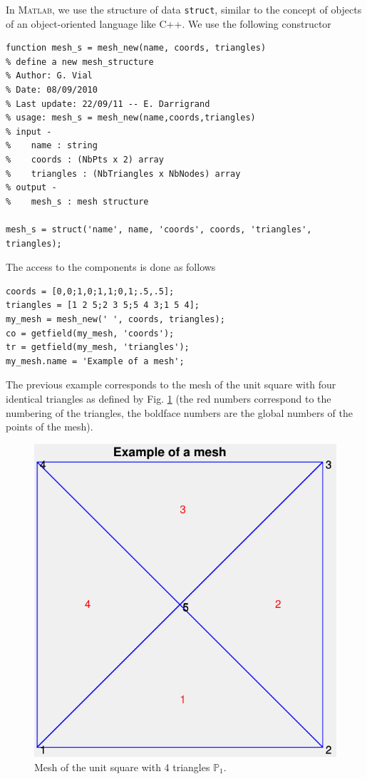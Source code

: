 \documentclass[11pt,a4paper,center,notitlepage]{article}
\numberwithin{equation}{section}
\begin{document}
In \textsc{Matlab}, we use the structure of data \texttt{struct}, similar to the concept of objects of an object-oriented language like C++. We use the following constructor
\begin{verbatim}
function mesh_s = mesh_new(name, coords, triangles)
% define a new mesh_structure
% Author: G. Vial
% Date: 08/09/2010
% Last update: 22/09/11 -- E. Darrigrand
% usage: mesh_s = mesh_new(name,coords,triangles)
% input -
%    name : string
%    coords : (NbPts x 2) array
%    triangles : (NbTriangles x NbNodes) array
% output -
%    mesh_s : mesh structure

mesh_s = struct('name', name, 'coords', coords, 'triangles', triangles);
\end{verbatim}
The access to the components is done as follows
\begin{verbatim}
coords = [0,0;1,0;1,1;0,1;.5,.5];
triangles = [1 2 5;2 3 5;5 4 3;1 5 4];
my_mesh = mesh_new(' ', coords, triangles);
co = getfield(my_mesh, 'coords');
tr = getfield(my_mesh, 'triangles');
my_mesh.name = 'Example of a mesh';
\end{verbatim}
The previous example corresponds to the mesh of the unit square with four identical triangles as defined by Fig. \ref{fig1} (the red numbers correspond to the numbering of the triangles, the boldface numbers are the global numbers of the points of the mesh).
\begin{figure}[H]
\centering
\includegraphics[scale=0.9]{1}
\caption{Mesh of the unit square with 4 triangles $\mathbb{P}_1$.}
\label{fig1}
\end{figure}
\end{document}
